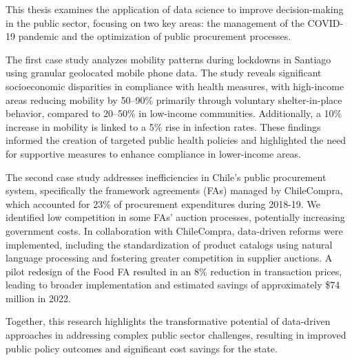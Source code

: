 \documentclass[upright, contnum]{umemoriaENG}
\begin{document}
\begin{abstractEng}





This thesis examines the application of data science to improve decision-making in the public sector, focusing on two key areas: the management of the COVID-19 pandemic and the optimization of public procurement processes.

The first case study analyzes mobility patterns during lockdowns in Santiago using granular geolocated mobile phone data. The study reveals significant socioeconomic disparities in compliance with health measures, with high-income areas reducing mobility by 50–90\% primarily through voluntary shelter-in-place behavior, compared to 20–50\% in low-income communities. Additionally, a 10\% increase in mobility is linked to a 5\% rise in infection rates. These findings informed the creation of targeted public health policies and highlighted the need for supportive measures to enhance compliance in lower-income areas.

The second case study addresses inefficiencies in Chile's public procurement system, specifically the framework agreements (FAs) managed by ChileCompra, which accounted for 23\% of procurement expenditures during 2018-19. We identified low competition in some FAs' auction processes, potentially increasing government costs. In collaboration with ChileCompra, data-driven reforms were implemented, including the standardization of product catalogs using natural language processing and fostering greater competition in supplier auctions. A pilot redesign of the Food FA resulted in an 8\% reduction in transaction prices, leading to broader implementation and estimated savings of approximately \$74 million in 2022.

Together, this research highlights the transformative potential of data-driven approaches in addressing complex public sector challenges, resulting in improved public policy outcomes and significant cost savings for the state.
\end{abstractEng} 
\end{document}
